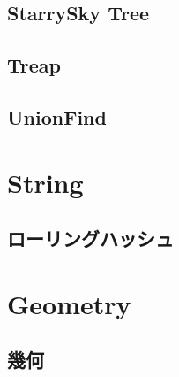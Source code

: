 \documentclass[titlepage, landscape, a4paper, 12pt, twocolumn]{jsarticle}
\begin{document}
\subsection{StarrySky Tree}

\subsection{Treap}

\subsection{UnionFind}



\section{String}
\subsection{ローリングハッシュ}



\section{Geometry}
\subsection{幾何}




%
%
\end{document}

